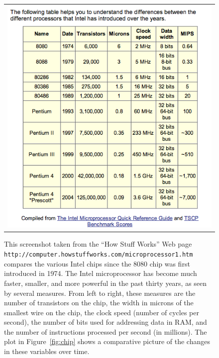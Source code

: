\begin{figure}
\begin{center}
\begin{tabular}{c}
\includegraphics[width=5in]{computerIntro/images/howStuffWorks.png}
\end{tabular}
\caption{This screenshot taken from the ``How Stuff Works'' Web page
  {\footnotesize{\texttt{http://computer.howstuffworks.com/microprocessor1.htm}}}
  compares the various Intel chips since the 8080 chip was first
  introduced in 1974.  The Intel microprocessor has become much
  faster, smaller, and more powerful in the past thirty years, as seen
  by several measures.  From left to right, these measures are the
  number of transistors on the chip, the width in microns of the
  smallest wire on the chip, the clock speed (number of cycles per
  second), the number of bits used for addressing data in RAM, and the
  number of instructions processed per second (in millions).  The plot
  in Figure~\ref{fig:chip} shows a comparative picture of the changes
  in these variables over time.}
\label{fig:HowStuffWorks}
\end{center}
\end{figure}


